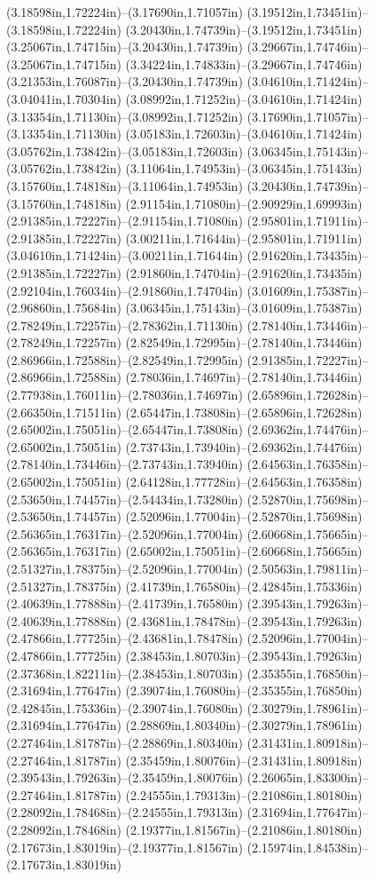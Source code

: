 (3.18598in,1.72224in)--(3.17690in,1.71057in) (3.19512in,1.73451in)--(3.18598in,1.72224in) (3.20430in,1.74739in)--(3.19512in,1.73451in) (3.25067in,1.74715in)--(3.20430in,1.74739in) (3.29667in,1.74746in)--(3.25067in,1.74715in) (3.34224in,1.74833in)--(3.29667in,1.74746in) (3.21353in,1.76087in)--(3.20430in,1.74739in) (3.04610in,1.71424in)--(3.04041in,1.70304in) (3.08992in,1.71252in)--(3.04610in,1.71424in) (3.13354in,1.71130in)--(3.08992in,1.71252in) (3.17690in,1.71057in)--(3.13354in,1.71130in) (3.05183in,1.72603in)--(3.04610in,1.71424in) (3.05762in,1.73842in)--(3.05183in,1.72603in) (3.06345in,1.75143in)--(3.05762in,1.73842in) (3.11064in,1.74953in)--(3.06345in,1.75143in) (3.15760in,1.74818in)--(3.11064in,1.74953in) (3.20430in,1.74739in)--(3.15760in,1.74818in) (2.91154in,1.71080in)--(2.90929in,1.69993in) (2.91385in,1.72227in)--(2.91154in,1.71080in) (2.95801in,1.71911in)--(2.91385in,1.72227in) (3.00211in,1.71644in)--(2.95801in,1.71911in) (3.04610in,1.71424in)--(3.00211in,1.71644in) (2.91620in,1.73435in)--(2.91385in,1.72227in) (2.91860in,1.74704in)--(2.91620in,1.73435in) (2.92104in,1.76034in)--(2.91860in,1.74704in) (3.01609in,1.75387in)--(2.96860in,1.75684in) (3.06345in,1.75143in)--(3.01609in,1.75387in) (2.78249in,1.72257in)--(2.78362in,1.71130in) (2.78140in,1.73446in)--(2.78249in,1.72257in) (2.82549in,1.72995in)--(2.78140in,1.73446in) (2.86966in,1.72588in)--(2.82549in,1.72995in) (2.91385in,1.72227in)--(2.86966in,1.72588in) (2.78036in,1.74697in)--(2.78140in,1.73446in) (2.77938in,1.76011in)--(2.78036in,1.74697in) (2.65896in,1.72628in)--(2.66350in,1.71511in) (2.65447in,1.73808in)--(2.65896in,1.72628in) (2.65002in,1.75051in)--(2.65447in,1.73808in) (2.69362in,1.74476in)--(2.65002in,1.75051in) (2.73743in,1.73940in)--(2.69362in,1.74476in) (2.78140in,1.73446in)--(2.73743in,1.73940in) (2.64563in,1.76358in)--(2.65002in,1.75051in) (2.64128in,1.77728in)--(2.64563in,1.76358in) (2.53650in,1.74457in)--(2.54434in,1.73280in) (2.52870in,1.75698in)--(2.53650in,1.74457in) (2.52096in,1.77004in)--(2.52870in,1.75698in) (2.56365in,1.76317in)--(2.52096in,1.77004in) (2.60668in,1.75665in)--(2.56365in,1.76317in) (2.65002in,1.75051in)--(2.60668in,1.75665in) (2.51327in,1.78375in)--(2.52096in,1.77004in) (2.50563in,1.79811in)--(2.51327in,1.78375in) (2.41739in,1.76580in)--(2.42845in,1.75336in) (2.40639in,1.77888in)--(2.41739in,1.76580in) (2.39543in,1.79263in)--(2.40639in,1.77888in) (2.43681in,1.78478in)--(2.39543in,1.79263in) (2.47866in,1.77725in)--(2.43681in,1.78478in) (2.52096in,1.77004in)--(2.47866in,1.77725in) (2.38453in,1.80703in)--(2.39543in,1.79263in) (2.37368in,1.82211in)--(2.38453in,1.80703in) (2.35355in,1.76850in)--(2.31694in,1.77647in) (2.39074in,1.76080in)--(2.35355in,1.76850in) (2.42845in,1.75336in)--(2.39074in,1.76080in) (2.30279in,1.78961in)--(2.31694in,1.77647in) (2.28869in,1.80340in)--(2.30279in,1.78961in) (2.27464in,1.81787in)--(2.28869in,1.80340in) (2.31431in,1.80918in)--(2.27464in,1.81787in) (2.35459in,1.80076in)--(2.31431in,1.80918in) (2.39543in,1.79263in)--(2.35459in,1.80076in) (2.26065in,1.83300in)--(2.27464in,1.81787in) (2.24555in,1.79313in)--(2.21086in,1.80180in) (2.28092in,1.78468in)--(2.24555in,1.79313in) (2.31694in,1.77647in)--(2.28092in,1.78468in) (2.19377in,1.81567in)--(2.21086in,1.80180in) (2.17673in,1.83019in)--(2.19377in,1.81567in) (2.15974in,1.84538in)--(2.17673in,1.83019in) 